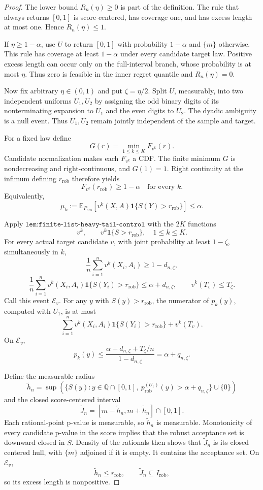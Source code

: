 \documentclass{article}
\begin{document}
\begin{proof}
The lower bound \(R_n(\eta)\ge0\) is part of the definition. The rule that always returns \([0,1]\) is score-centered, has coverage one, and has excess length at most one. Hence \(R_n(\eta)\le1\).

If \(\eta\ge1-\alpha\), use \(U\) to return \([0,1]\) with probability \(1-\alpha\) and \(\{m\}\) otherwise. This rule has coverage at least \(1-\alpha\) under every candidate target law. Positive excess length can occur only on the full-interval branch, whose probability is at most \(\eta\). Thus zero is feasible in the inner regret quantile and \(R_n(\eta)=0\).

Now fix arbitrary \(\eta\in(0,1)\) and put \(\zeta=\eta/2\). Split \(U\), measurably, into two independent uniforms \(U_1,U_2\) by assigning the odd binary digits of its nonterminating expansion to \(U_1\) and the even digits to \(U_2\). The dyadic ambiguity is a null event. Thus \(U_1,U_2\) remain jointly independent of the sample and target.

For a fixed law define
\[
G(r)=\min_{1\le k\le K}F_{v^k}(r).
\]
Candidate normalization makes each \(F_{v^k}\) a CDF. The finite minimum \(G\) is nondecreasing and right-continuous, and \(G(1)=1\). Right continuity at the infimum defining \(r_{\mathrm{rob}}\) therefore yields
\[
F_{v^k}(r_{\mathrm{rob}})\ge1-\alpha
\quad\text{for every }k.
\]
Equivalently,
\[
\mu_k:=
\mathbb E_{P_{\mathrm{obs}}}
[v^k(X,A)\mathbf 1\{S(Y)>r_{\mathrm{rob}}\}]
\le\alpha.
\]

Apply \(\texttt{lem:finite-list-heavy-tail-control}\) with the \(2K\) functions
\[
v^k,\qquad
v^k\mathbf 1\{S>r_{\mathrm{rob}}\},
\quad 1\le k\le K.
\]
For every actual target candidate \(v\), with joint probability at least \(1-\zeta\), simultaneously in \(k\),
\[
\frac1n\sum_{i=1}^n v^k(X_i,A_i)\ge1-d_{n,\zeta},
\]
\[
\frac1n\sum_{i=1}^n
 v^k(X_i,A_i)\mathbf 1\{S(Y_i)>r_{\mathrm{rob}}\}
 \le\alpha+d_{n,\zeta},
\qquad
v^k(T_v)\le T_\zeta.
\]
Call this event \(\mathcal E_v\). For any \(y\) with \(S(y)>r_{\mathrm{rob}}\), the numerator of \(p_k(y)\), computed with \(U_1\), is at most
\[
\sum_{i=1}^n
v^k(X_i,A_i)\mathbf 1\{S(Y_i)>r_{\mathrm{rob}}\}
+v^k(T_v).
\]
On \(\mathcal E_v\),
\[
p_k(y)
\le\frac{\alpha+d_{n,\zeta}+T_\zeta/n}
         {1-d_{n,\zeta}}
=\alpha+q_{n,\zeta}.
\]

Define the measurable radius
\[
\widetilde h_n=
\sup\left(
 \{S(y):y\in\mathbb Q\cap[0,1],\
 p_{\mathrm{rob}}^{(U_1)}(y)>
 \alpha+q_{n,\zeta}\}\cup\{0\}\right)
\]
and the closed score-centered interval
\[
\widetilde J_n=
[m-\widetilde h_n,m+\widetilde h_n]\cap[0,1].
\]
Each rational-point p-value is measurable, so \(\widetilde h_n\) is measurable. Monotonicity of every candidate p-value in the score implies that the robust acceptance set is downward closed in \(S\). Density of the rationals then shows that \(\widetilde J_n\) is its closed centered hull, with \(\{m\}\) adjoined if it is empty. It contains the acceptance set. On \(\mathcal E_v\),
\[
\widetilde h_n\le r_{\mathrm{rob}},\qquad
\widetilde J_n\subseteq I_{\mathrm{rob}},
\]
so its excess length is nonpositive.


\end{proof}
\end{document}
